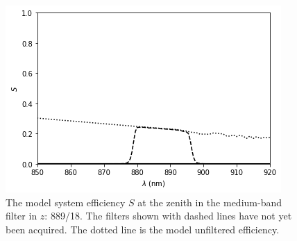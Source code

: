 \begin{figure}
\begin{center}
\includegraphics[width=0.7\linewidth]{figures/huitzi-S-NBMB-z.png}
\medskip
\caption{The model system efficiency $S$ at the zenith in the medium-band filter in $z$: 889/18. The filters shown with dashed lines have not yet been acquired. The dotted line is the model unfiltered efficiency.}
\label{figure:huitzi-S-last}
\end{center}
\end{figure}

